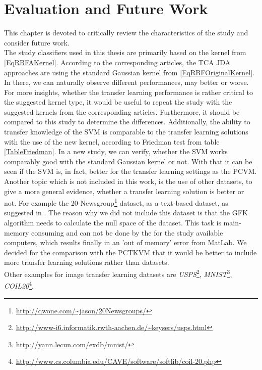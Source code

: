 \chapter{Evaluation and Future Work}\label{EvalF}	
This chapter is devoted to critically review the characteristics of the study and consider future work.\\
The study classifiers used in this thesis are primarily based on the kernel from \eqref{EqRBFAKernel}.
According to the corresponding articles, the \acs{TCA} \acs{JDA} approaches are using the standard Gaussian kernel from \eqref{EqRBFOriginalKernel}.\cite{Long.}\cite{Pan.2011}
In there, we can naturally observe different performances, may better or worse.
For more insights, whether the transfer learning performance is rather critical to the suggested kernel type, it would be useful to repeat the study with the suggested kernels from the corresponding articles.
Furthermore, it should be compared to this study to determine the differences.
Additionally, the ability to transfer knowledge of the \acs{SVM} is comparable to the transfer learning solutions with the use of the new kernel, according to Friedman test from table \ref{TableFriedman}.
In a new study, we can verify, whether the \acs{SVM} works comparably good with the standard Gaussian kernel or not.
With that it can be seen if the \acs{SVM} is, in fact, better for the transfer learning settings as the \acs{PCVM}.\\
Another topic which is not included in this work, is the use of other datasets, to give a more general evidence, whether a transfer learning solution is better or not.
For example the 20-Newsgroup\footnote{\url{http://qwone.com/~jason/20Newsgroups/}} dataset, as a text-based dataset, as suggested in \cite{Pan.2010}.
The reason why we did not include this dataset is that the \acs{GFK} algorithm needs to calculate the null space of the dataset.
This task is main-memory consuming and can not be done by the for the study available computers, which results finally in an 'out of memory' error from MatLab.
We decided for the comparison with the \acs{PCTKVM} that it would be better to include more transfer learning solutions rather than datasets.\\
Other examples for image transfer learning datasets are \textit{USPS}\footnote{\url{http://www-i6.informatik.rwth-aachen.de/~keysers/usps.html}}, \textit{MNIST}\footnote{\url{http://yann.lecun.com/exdb/mnist/}}, \textit{COIL20}\footnote{\url{http://www.cs.columbia.edu/CAVE/software/softlib/coil-20.php}}.\\\cite{Long.}\cite{Long.2014}
